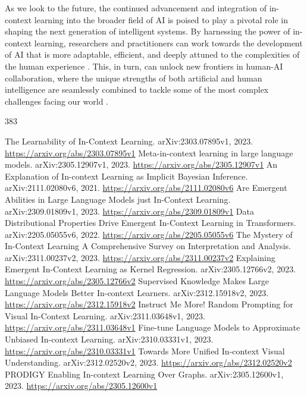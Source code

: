 \documentclass[11pt]{article}
\begin{document}
As we look to the future, the continued advancement and integration of in-context learning into the broader field of AI is poised to play a pivotal role in shaping the next generation of intelligent systems. By harnessing the power of in-context learning, researchers and practitioners can work towards the development of AI that is more adaptable, efficient, and deeply attuned to the complexities of the human experience \cite{ref381,ref382}. This, in turn, can unlock new frontiers in human-AI collaboration, where the unique strengths of both artificial and human intelligence are seamlessly combined to tackle some of the most complex challenges facing our world \cite{ref383,ref377}.


\begin{thebibliography}{383}
 The Learnability of In-Context Learning. arXiv:2303.07895v1, 2023. \url{https://arxiv.org/abs/2303.07895v1}
 Meta-in-context learning in large language models. arXiv:2305.12907v1, 2023. \url{https://arxiv.org/abs/2305.12907v1}
 An Explanation of In-context Learning as Implicit Bayesian Inference. arXiv:2111.02080v6, 2021. \url{https://arxiv.org/abs/2111.02080v6}
 Are Emergent Abilities in Large Language Models just In-Context Learning. arXiv:2309.01809v1, 2023. \url{https://arxiv.org/abs/2309.01809v1}
 Data Distributional Properties Drive Emergent In-Context Learning in Transformers. arXiv:2205.05055v6, 2022. \url{https://arxiv.org/abs/2205.05055v6}
 The Mystery of In-Context Learning A Comprehensive Survey on Interpretation and Analysis. arXiv:2311.00237v2, 2023. \url{https://arxiv.org/abs/2311.00237v2}
 Explaining Emergent In-Context Learning as Kernel Regression. arXiv:2305.12766v2, 2023. \url{https://arxiv.org/abs/2305.12766v2}
 Supervised Knowledge Makes Large Language Models Better In-context Learners. arXiv:2312.15918v2, 2023. \url{https://arxiv.org/abs/2312.15918v2}
 Instruct Me More! Random Prompting for Visual In-Context Learning. arXiv:2311.03648v1, 2023. \url{https://arxiv.org/abs/2311.03648v1}
 Fine-tune Language Models to Approximate Unbiased In-context Learning. arXiv:2310.03331v1, 2023. \url{https://arxiv.org/abs/2310.03331v1}
 Towards More Unified In-context Visual Understanding. arXiv:2312.02520v2, 2023. \url{https://arxiv.org/abs/2312.02520v2}
 PRODIGY Enabling In-context Learning Over Graphs. arXiv:2305.12600v1, 2023. \url{https://arxiv.org/abs/2305.12600v1}

\end{thebibliography}
\end{document}
